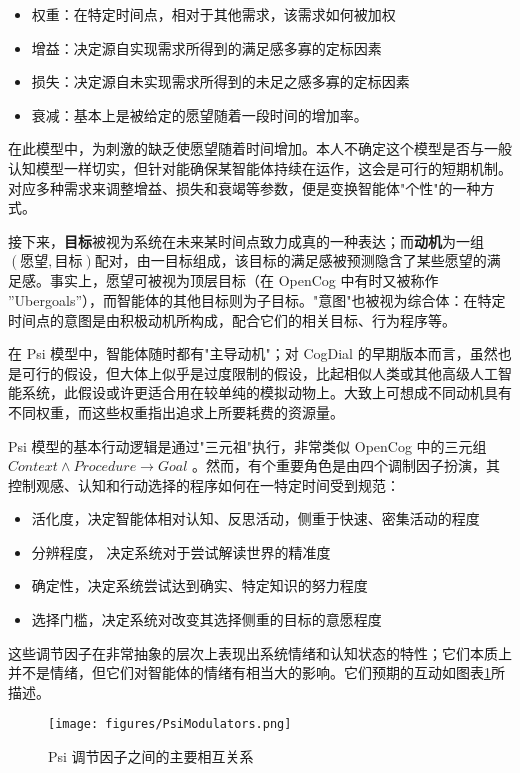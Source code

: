 \begin{itemize}
\item 权重：在特定时间点，相对于其他需求，该需求如何被加权
\item  增益：决定源自实现需求所得到的满足感多寡的定标因素
\item  损失：决定源自未实现需求所得到的未足之感多寡的定标因素
\item  衰减：基本上是被给定的愿望随着一段时间的增加率。

\end{itemize}

在此模型中，为刺激的缺乏使愿望随着时间增加。本人不确定这个模型是否与一般认知模型一样切实，但针对能确保某智能体持续在运作，这会是可行的短期机制。对应多种需求来调整增益、损失和衰竭等参数，便是变换智能体"个性"的一种方式。

接下来，{\bf 目标}被视为系统在未来某时间点致力成真的一种表达；而{\bf 动机}为一组 $(愿望, 目标)$配对，由一目标组成，该目标的满足感被预测隐含了某些愿望的满足感。事实上，愿望可被视为顶层目标（在 OpenCog 中有时又被称作 ”Ubergoals”），而智能体的其他目标则为子目标。"意图"也被视为综合体：在特定时间点的意图是由积极动机所构成，配合它们的相关目标、行为程序等。

在 Psi 模型中，智能体随时都有"主导动机"；对 CogDial 的早期版本而言，虽然也是可行的假设，但大体上似乎是过度限制的假设，比起相似人类或其他高级人工智能系统，此假设或许更适合用在较单纯的模拟动物上。大致上可想成不同动机具有不同权重，而这些权重指出追求上所要耗费的资源量。

Psi 模型的基本行动逻辑是通过"三元祖"执行，非常类似 OpenCog 中的三元组$\textit{Context} \land \textit{Procedure} \rightarrow \textit{Goal}$ 。然而，有个重要角色是由四个调制因子扮演，其控制观感、认知和行动选择的程序如何在一特定时间受到规范：

\begin{itemize}
\item  活化度，决定智能体相对认知、反思活动，侧重于快速、密集活动的程度 
\item 分辨程度， 决定系统对于尝试解读世界的精准度 
\item 确定性，决定系统尝试达到确实、特定知识的努力程度 
\item 选择门槛，决定系统对改变其选择侧重的目标的意愿程度
\end{itemize}

这些调节因子在非常抽象的层次上表现出系统情绪和认知状态的特性；它们本质上并不是情绪，但它们对智能体的情绪有相当大的影响。它们预期的互动如图表\ref{fig:mod}所描述。


\begin{figure}[htb]
\centering
\texttt{[image: figures/PsiModulators.png]}
\caption{Psi 调节因子之间的主要相互关系}
\label{fig:mod}
\end{figure}

